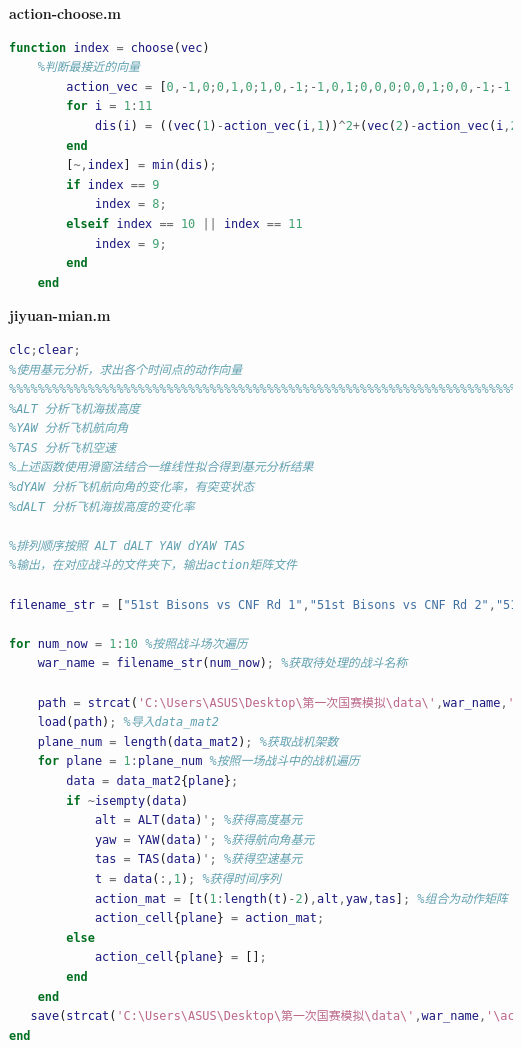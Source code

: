 \documentclass{my_paper}
\begin{document}
\textbf{action-choose.m}
\begin{lstlisting}[language=matlab]
    function index = choose(vec)
    %判断最接近的向量
        action_vec = [0,-1,0;0,1,0;1,0,-1;-1,0,1;0,0,0;0,0,1;0,0,-1;-1,1,1;-1,-1,1;1,1,-1;1,-1,-1]; %最后两个是叠加态判断
        for i = 1:11
            dis(i) = ((vec(1)-action_vec(i,1))^2+(vec(2)-action_vec(i,2))^2+(vec(3)-action_vec(i,3))^2)^0.5;%计算距离
        end
        [~,index] = min(dis);
        if index == 9
            index = 8;
        elseif index == 10 || index == 11
            index = 9;
        end
    end
\end{lstlisting}

\textbf{jiyuan-mian.m}
\begin{lstlisting}[language=matlab]
    %%%%%%%%%%%%%%%%%%%%%%%%%%%%%%%%%%%%%%%%%%%%%%%%%%%%%%%%%%%%%%%%%%%%%%%%%%%
clc;clear;
%使用基元分析，求出各个时间点的动作向量
%%%%%%%%%%%%%%%%%%%%%%%%%%%%%%%%%%%%%%%%%%%%%%%%%%%%%%%%%%%%%%%%%%%%%%%%%%%
%ALT 分析飞机海拔高度
%YAW 分析飞机航向角
%TAS 分析飞机空速
%上述函数使用滑窗法结合一维线性拟合得到基元分析结果
%dYAW 分析飞机航向角的变化率，有突变状态
%dALT 分析飞机海拔高度的变化率

%排列顺序按照 ALT dALT YAW dYAW TAS 
%输出，在对应战斗的文件夹下，输出action矩阵文件 

filename_str = ["51st Bisons vs CNF Rd 1","51st Bisons vs CNF Rd 2","51st vs 36th R1","51st vs 36th R2","51st vs uvaf round 1","51st vs uvaf round 2","51st vs uvaf round 3","51stKIAP_vs_36th_Round_1","51stKIAP_vs_36th_Round_2","51stKIAP_vs_107th_Round_1"];

for num_now = 1:10 %按照战斗场次遍历
    war_name = filename_str(num_now); %获取待处理的战斗名称
    
    path = strcat('C:\Users\ASUS\Desktop\第一次国赛模拟\data\',war_name,'\data_mat.mat');
    load(path); %导入data_mat2 
    plane_num = length(data_mat2); %获取战机架数
    for plane = 1:plane_num %按照一场战斗中的战机遍历
        data = data_mat2{plane};
        if ~isempty(data)
            alt = ALT(data)'; %获得高度基元            
            yaw = YAW(data)'; %获得航向角基元
            tas = TAS(data)'; %获得空速基元
            t = data(:,1); %获得时间序列  
            action_mat = [t(1:length(t)-2),alt,yaw,tas]; %组合为动作矩阵
            action_cell{plane} = action_mat;
        else
            action_cell{plane} = [];
        end
    end
   save(strcat('C:\Users\ASUS\Desktop\第一次国赛模拟\data\',war_name,'\action_cell.mat'),'action_cell');
end

\end{lstlisting}
\end{document}
